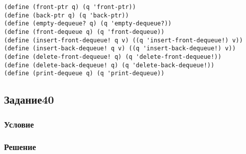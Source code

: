 \documentclass[10pt,a4paper]{article}
\begin{document}
\begin{lstlisting}
(define (front-ptr q) (q 'front-ptr))
(define (back-ptr q) (q 'back-ptr))
(define (empty-dequeue? q) (q 'empty-dequeue?))
(define (front-dequeue q) (q 'front-dequeue))
(define (insert-front-dequeue! q v) ((q 'insert-front-dequeue!) v))
(define (insert-back-dequeue! q v) ((q 'insert-back-dequeue!) v))
(define (delete-front-dequeue! q) (q 'delete-front-dequeue!))
(define (delete-back-dequeue! q) (q 'delete-back-dequeue!))
(define (print-dequeue q) (q 'print-dequeue))

\end{lstlisting}


\subsection*{Задание40}
\subsubsection*{Условие}
\subsubsection*{Решение}
\begin{lstlisting}
\end{lstlisting}
\end{document}
